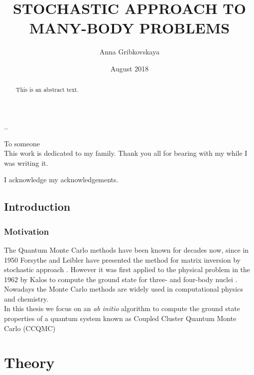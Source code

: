 \documentclass[twoside,english]{uiofysmaster}
\author{Anna Gribkovskaya}
\title{\uppercase{Stochastic Approach to Many-Body problems}}
\date{August 2018}
\theoremstyle{definition}
\begin{document}
\begin{titlepage}
..\maketitle
\end{titlepage}
\begin{abstract}
	This is an abstract text.
\end{abstract}

\begin{dedication}
	To someone
	\\\vspace{12pt}
	This work is dedicated to my family. Thank you all for bearing with my while I was writing it.
\end{dedication}
\begin{acknowledgements}
	I acknowledge my acknowledgements.
\end{acknowledgements}
\tableofcontents

\chapter*{Introduction}

\section*{Motivation}
The Quantum Monte Carlo methods have been known for decades now, since in 1950  Forsythe and Leibler have presented the method for matrix inversion by stochastic approach \cite{forsytheMatrixVersionMonte1950}. However it was first applied to the physical problem in the 1962 by Kalos to compute the ground state for three- and four-body nuclei \cite{kalosMonteCarloCalculations1962}. Nowadays the Monte Carlo methods are widely used in computational physics and chemistry.\\
In this thesis we focus on an \textit{ab initio} algorithm to compute the ground state properties of a quantum system known as  Coupled Cluster Quantum Monte Carlo (CCQMC) 

	
\part{Theory}
\end{document}
